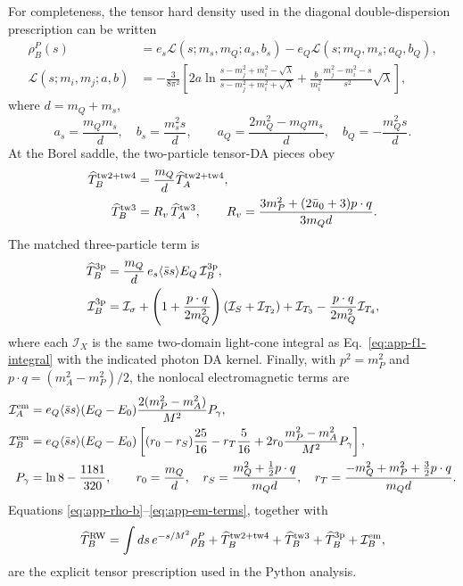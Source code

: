 \documentclass[11pt]{article}
\newcommand{\ssbar}{\langle\bar s s\rangle}
\begin{document}
For completeness, the tensor hard density used in the diagonal
double-dispersion prescription can be written
\begin{align}
 \rho_B^P(s)&=e_s\mathcal L(s;m_s,m_Q;a_s,b_s)
              -e_Q\mathcal L(s;m_Q,m_s;a_Q,b_Q),\nonumber\\
 \mathcal L(s;m_i,m_j;a,b)&=-\frac{3}{8\pi^2}\left[
 2a\ln\frac{s-m_j^2+m_i^2-\sqrt{\lambda}}
 {s-m_j^2+m_i^2+\sqrt{\lambda}}
 +\frac{b}{m_i^2}\frac{m_j^2-m_i^2-s}{s^2}\sqrt{\lambda}\right],
 \label{eq:app-rho-b}
\end{align}
where $d=m_Q+m_s$,
\begin{equation}
 a_s=\frac{m_Qm_s}{d},\quad b_s=\frac{m_s^2s}{d},\qquad
 a_Q=\frac{2m_Q^2-m_Qm_s}{d},\quad b_Q=-\frac{m_Q^2s}{d}.
\end{equation}
At the Borel saddle, the two-particle tensor-DA pieces obey
\begin{align}
 \widehat T_B^{\rm tw2+tw4}
 &=\frac{m_Q}{d}\widehat T_A^{\rm tw2+tw4},\nonumber\\
 \widehat T_B^{\rm tw3}
 &=R_v\,\widehat T_A^{\rm tw3},\qquad
 R_v=\frac{3m_P^2+(2\bar u_0+3)p\cdot q}{3m_Qd}.
 \label{eq:app-tensor-2p}
\end{align}
The matched three-particle term is
\begin{align}
 \widehat T_B^{\rm 3p}
 &=\frac{m_Q}{d}\,e_s\ssbar E_Q\,\mathcal I_B^{\rm 3p},\nonumber\\
 \mathcal I_B^{\rm 3p}
 &=\mathcal I_\sigma+
 \left(1+\frac{p\cdot q}{2m_Q^2}\right)(\mathcal I_S+\mathcal I_{T_2})
 +\mathcal I_{T_3}-\frac{p\cdot q}{2m_Q^2}\mathcal I_{T_4},
 \label{eq:app-tensor-3p}
\end{align}
where each $\mathcal I_X$ is the same two-domain light-cone integral as
Eq.~\eqref{eq:app-f1-integral} with the indicated photon DA kernel.
Finally, with
$p^2=m_P^2$ and $p\cdot q=(m_A^2-m_P^2)/2$, the nonlocal electromagnetic
terms are
\begin{align}
 \mathcal I_A^{\rm em}
 &=e_Q\ssbar(E_Q-E_0)
 \frac{2(m_P^2-m_A^2)}{M^2}P_\gamma,\nonumber\\
 \mathcal I_B^{\rm em}
 &=e_Q\ssbar(E_Q-E_0)\left[
 (r_0-r_S)\frac{25}{16}-r_T\frac{5}{16}
 +2r_0\frac{m_P^2-m_A^2}{M^2}P_\gamma\right],
 \label{eq:app-em-terms}\\
 P_\gamma&=\ln8-\frac{1181}{320},\qquad
 r_0=\frac{m_Q}{d},\quad
 r_S=\frac{m_Q^2+\tfrac12p\cdot q}{m_Qd},\quad
 r_T=\frac{-m_Q^2+m_P^2+\tfrac32p\cdot q}{m_Qd}.\nonumber
\end{align}
Equations \eqref{eq:app-rho-b}--\eqref{eq:app-em-terms}, together with
\begin{equation}
 \widehat T_B^{\rm RW}=\int ds\,e^{-s/M^2}\rho_B^P
 +\widehat T_B^{\rm tw2+tw4}
 +\widehat T_B^{\rm tw3}
 +\widehat T_B^{\rm 3p}
 +\mathcal I_B^{\rm em},
\end{equation}
are the explicit tensor prescription used in the Python analysis.
\end{document}
